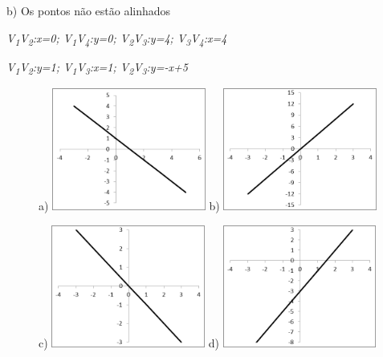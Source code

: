 \begin{respostas}{3}
b) Os pontos não estão alinhados

\ansitem{}  \textit{V\textsubscript{1}V\textsubscript{2}:x=0; V\textsubscript{1}V\textsubscript{4}:y=0; V\textsubscript{2}V\textsubscript{3}:y=4; V\textsubscript{3}V\textsubscript{4}:x=4}

\ansitem{}  \textit{V\textsubscript{1}V\textsubscript{2}:y=1; V\textsubscript{1}V\textsubscript{3}:x=1; V\textsubscript{2}V\textsubscript{3}:y=-x+5}

\begin{figure}[H]
	\ansitem{}

	a) \includegraphics[width=0.45\textwidth]{capitulos/funcao_do_primeiro_grau/media/image43.png} 
	b) \includegraphics[width=0.45\textwidth]{capitulos/funcao_do_primeiro_grau/media/image44.png}
\end{figure}

\begin{figure}[H]
	c) \includegraphics[width=0.45\textwidth]{capitulos/funcao_do_primeiro_grau/media/image45.png} 
	d) \includegraphics[width=0.45\textwidth]{capitulos/funcao_do_primeiro_grau/media/image46.png}
\end{figure}


\end{respostas}
